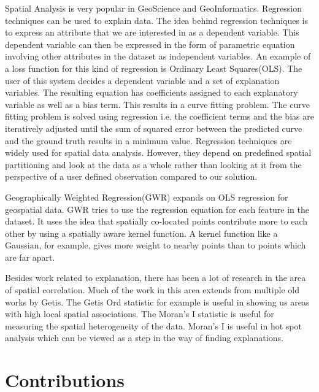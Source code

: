 Spatial Analysis is very popular in GeoScience and GeoInformatics. Regression techniques can be used to explain data\citep{dunn1986applied,cleveland1988locally}. The idea behind regression techniques is to express an attribute that we are interested in as a dependent variable. This dependent variable can then be expressed in the form of parametric equation involving other attributes in the dataset as independent variables. An example of a loss function for this kind of regression is Ordinary Least Squares(OLS)\citep{dismuke2006ordinary}. The user of this system decides a dependent variable and a set of explanation variables. The resulting equation has coefficients assigned to each explanatory variable as well as a bias term. This results in a curve fitting problem. The curve fitting problem is solved using regression i.e. the coefficient terms and the bias are iteratively adjusted until the sum of squared error between the predicted curve and the ground truth results in a minimum value. Regression techniques are widely used for spatial data analysis. However, they depend on predefined spatial partitioning and look at the data as a whole rather than looking at it from the perspective of a user defined observation compared to our solution.

Geographically Weighted Regression(GWR) expands on OLS regression for geospatial data\citep{brunsdon1998geographically,charlton2009geographically}. GWR tries to use the regression equation for each feature in the dataset. It uses the idea that spatially co-located points contribute more to each other by using a spatially aware kernel function. A kernel function like a Gaussian, for example, gives more weight to nearby points than to points which are far apart.

Besides work related to explanation, there has been a lot of research in the area of spatial correlation. Much of the work in this area extends from multiple old works by Getis\citep{getis1991spatial,ord1995local,getis1996local,getis2002comparative,getis2007reflections}. The Getis Ord statistic \citep{ord1995local} for example is useful in showing us areas with high local spatial associations. The Moran's I statistic is useful for measuring the spatial heterogeneity of the data\citep{assuncao1999new,zhang2008use}. Moran's I is useful in hot spot analysis which can be viewed as a step in the way of finding explanations.

\section{Contributions}


